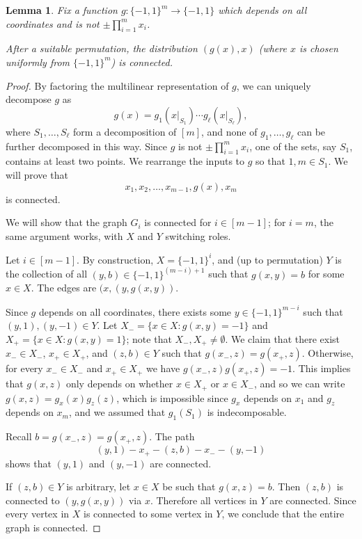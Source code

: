 \documentclass{article}
\newtheorem{lemma}[theorem]{Lemma}
\theoremstyle{definition}
\theoremstyle{remark}
\begin{document}
\begin{lemma} \label{lem:g-connected}
Fix a function $g\colon \{-1,1\}^m \to \{-1,1\}$ which depends on all coordinates and is not $\pm \prod_{i=1}^m x_i$.

After a suitable permutation, the distribution $(g(x),x)$ (where $x$ is chosen uniformly from $\{-1,1\}^m$) is connected.
\end{lemma}
\begin{proof}
By factoring the multilinear representation of $g$, we can uniquely decompose $g$ as
\[
 g(x) = g_1(x|_{S_1}) \cdots g_\ell(x|_{S_\ell}),
\]
where $S_1,\ldots,S_\ell$ form a decomposition of $[m]$, and none of $g_1,\ldots,g_\ell$ can be further decomposed in this way. Since $g$ is not $\pm \prod_{i=1}^m x_i$, one of the sets, say $S_1$, contains at least two points. We rearrange the inputs to $g$ so that $1,m \in S_1$. We will prove that
\[
 x_1,x_2,\ldots,x_{m-1},g(x),x_m
\]
is connected.

We will show that the graph $G_i$ is connected for $i \in [m-1]$; for $i = m$, the same argument works, with $X$ and $Y$ switching roles.

Let $i \in [m-1]$.
By construction, $X = \{-1,1\}^i$, and (up to permutation) $Y$ is the collection of all $(y,b) \in \{-1,1\}^{(m-i)+1}$ such that $g(x,y) = b$ for some $x \in X$. The edges are $(x,(y,g(x,y))$.

Since $g$ depends on all coordinates, there exists some $y \in \{-1,1\}^{m-i}$ such that $(y,1),(y,-1) \in Y$. Let $X_- = \{ x \in X : g(x,y) = -1 \}$ and $X_+ = \{ x \in X : g(x,y) = 1 \}$; note that $X_-,X_+ \neq \emptyset$. We claim that there exist $x_- \in X_-$, $x_+ \in X_+$, and $(z,b) \in Y$ such that $g(x_-,z) = g(x_+,z)$. Otherwise, for every $x_- \in X_-$ and $x_+ \in X_+$ we have $g(x_-,z) g(x_+,z) = -1$. This implies that $g(x,z)$ only depends on whether $x \in X_+$ or $x \in X_-$, and so we can write $g(x,z) = g_x(x) g_z(z)$, which is impossible since $g_x$ depends on $x_1$ and $g_z$ depends on $x_m$, and we assumed that $g_1(S_1)$ is indecomposable.

Recall $b = g(x_-,z) = g(x_+,z)$. The path
\[
 (y,1) - x_+ - (z,b) - x_- - (y,-1)
\]
shows that $(y,1)$ and $(y,-1)$ are connected.

If $(z,b) \in Y$ is arbitrary, let $x \in X$ be such that $g(x,z) = b$. Then $(z,b)$ is connected to $(y,g(x,y))$ via $x$. Therefore all vertices in $Y$ are connected. Since every vertex in $X$ is connected to some vertex in $Y$, we conclude that the entire graph is connected.
\end{proof}
\end{document}
